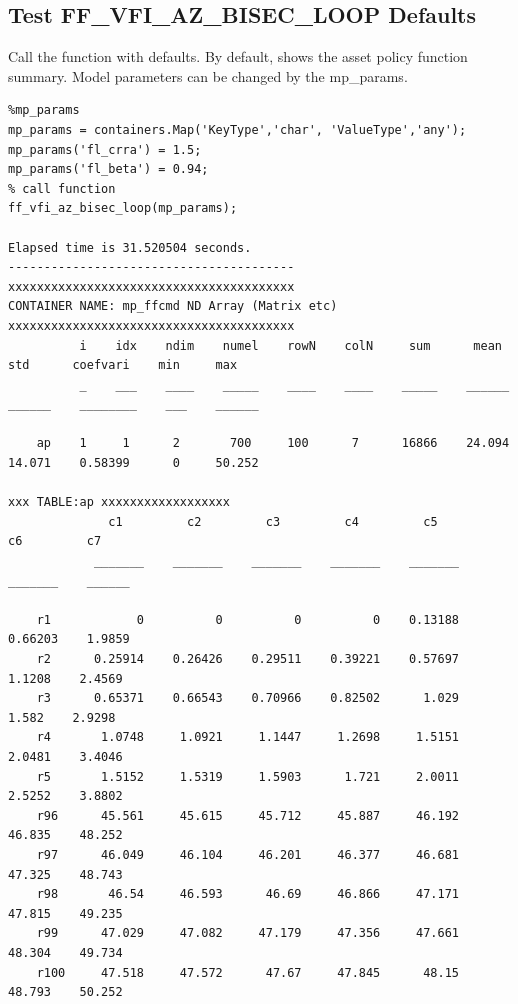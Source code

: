 \documentclass[
]{book}
\begin{document}
\hypertarget{test-ff_vfi_az_bisec_loop-defaults}{%
\subsection{Test FF\_VFI\_AZ\_BISEC\_LOOP Defaults}\label{test-ff_vfi_az_bisec_loop-defaults}}

Call the function with defaults. By default, shows the asset policy
function summary. Model parameters can be changed by the mp\_params.

\begin{verbatim}
%mp_params
mp_params = containers.Map('KeyType','char', 'ValueType','any');
mp_params('fl_crra') = 1.5;
mp_params('fl_beta') = 0.94;
% call function
ff_vfi_az_bisec_loop(mp_params);

Elapsed time is 31.520504 seconds.
----------------------------------------
xxxxxxxxxxxxxxxxxxxxxxxxxxxxxxxxxxxxxxxx
CONTAINER NAME: mp_ffcmd ND Array (Matrix etc)
xxxxxxxxxxxxxxxxxxxxxxxxxxxxxxxxxxxxxxxx
          i    idx    ndim    numel    rowN    colN     sum      mean      std      coefvari    min     max  
          _    ___    ____    _____    ____    ____    _____    ______    ______    ________    ___    ______

    ap    1     1      2       700     100      7      16866    24.094    14.071    0.58399      0     50.252

xxx TABLE:ap xxxxxxxxxxxxxxxxxx
              c1         c2         c3         c4         c5         c6         c7  
            _______    _______    _______    _______    _______    _______    ______

    r1            0          0          0          0    0.13188    0.66203    1.9859
    r2      0.25914    0.26426    0.29511    0.39221    0.57697     1.1208    2.4569
    r3      0.65371    0.66543    0.70966    0.82502      1.029      1.582    2.9298
    r4       1.0748     1.0921     1.1447     1.2698     1.5151     2.0481    3.4046
    r5       1.5152     1.5319     1.5903      1.721     2.0011     2.5252    3.8802
    r96      45.561     45.615     45.712     45.887     46.192     46.835    48.252
    r97      46.049     46.104     46.201     46.377     46.681     47.325    48.743
    r98       46.54     46.593      46.69     46.866     47.171     47.815    49.235
    r99      47.029     47.082     47.179     47.356     47.661     48.304    49.734
    r100     47.518     47.572      47.67     47.845      48.15     48.793    50.252
\end{verbatim}
\end{document}
